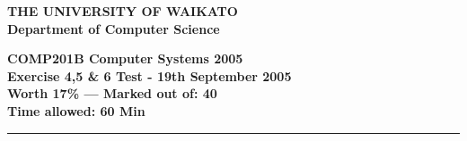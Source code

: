 \documentclass[a4paper,10pt]{article}
\begin{document}
\newcommand{\testmarks}[1]
{\begin{flushright}{\bf (#1 marks)}\end{flushright}}

{\centering \large \bf THE UNIVERSITY OF WAIKATO\\}
{\centering \large \bf Department of Computer Science\\[0.5cm]}

{\centering \large \bf COMP201B Computer Systems 2005\\}
{\centering \large \bf Exercise 4,5 \& 6 Test - 19th September 2005\\[0.3cm]}
{\centering \bf Worth 17\% --- Marked out of: 40\\[0.3cm]}
{\centering \bf Time allowed: 60 Min\\[1cm]}
\hrule
\end{document}
